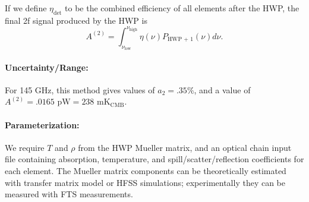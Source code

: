 If we define $\eta_\text{det}$ to be the combined efficiency of all elements after the HWP,
the final 2f signal produced by the HWP is 
\[
A^{(2)} = \int_{\nu_\text{low}}^{\nu_\text{high}} \eta(\nu) P_\text{HWP + 1}(\nu) d\nu.
\]
\paragraph{Uncertainty/Range:}
For 145 GHz, this method gives values of $a_2 = .35\%$, and a value of 
$A^{(2)} = .0165 \text{ pW} = 238 \text{ mK}_\text{CMB}$. 

\paragraph{Parameterization:}
We require $T$ and $\rho$ from the HWP Mueller matrix\cite{Salatino16}, and an optical chain input file containing
absorption, temperature, and spill/scatter/reflection coefficients for each element. The Mueller matrix components can be theoretically estimated with transfer matrix model \cite{Essinger-Hileman2013} or HFSS simulations; experimentally they can be measured with FTS measurements.

